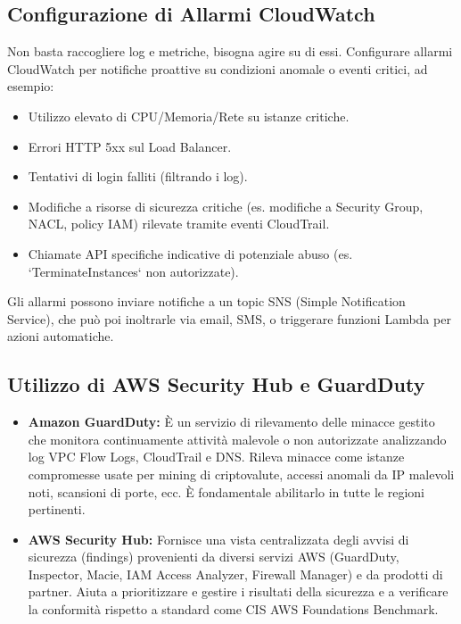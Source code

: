 \documentclass[a4paper,12pt]{report}
\begin{document}
\subsection{Configurazione di Allarmi CloudWatch}
\label{subsec:cloudwatch-alarms}
Non basta raccogliere log e metriche, bisogna agire su di essi. Configurare allarmi CloudWatch per notifiche proattive su condizioni anomale o eventi critici, ad esempio:
\begin{itemize}
    \item Utilizzo elevato di CPU/Memoria/Rete su istanze critiche.
    \item Errori HTTP 5xx sul Load Balancer.
    \item Tentativi di login falliti (filtrando i log).
    \item Modifiche a risorse di sicurezza critiche (es. modifiche a Security Group, NACL, policy IAM) rilevate tramite eventi CloudTrail.
    \item Chiamate API specifiche indicative di potenziale abuso (es. `TerminateInstances` non autorizzate).
\end{itemize}
Gli allarmi possono inviare notifiche a un topic SNS (Simple Notification Service), che può poi inoltrarle via email, SMS, o triggerare funzioni Lambda per azioni automatiche.

\subsection{Utilizzo di AWS Security Hub e GuardDuty}
\label{subsec:security-hub-guardduty}
\begin{itemize}
    \item \textbf{Amazon GuardDuty:} È un servizio di rilevamento delle minacce gestito che monitora continuamente attività malevole o non autorizzate analizzando log VPC Flow Logs, CloudTrail e DNS. Rileva minacce come istanze compromesse usate per mining di criptovalute, accessi anomali da IP malevoli noti, scansioni di porte, ecc. È fondamentale abilitarlo in tutte le regioni pertinenti.
    \item \textbf{AWS Security Hub:} Fornisce una vista centralizzata degli avvisi di sicurezza (findings) provenienti da diversi servizi AWS (GuardDuty, Inspector, Macie, IAM Access Analyzer, Firewall Manager) e da prodotti di partner. Aiuta a prioritizzare e gestire i risultati della sicurezza e a verificare la conformità rispetto a standard come CIS AWS Foundations Benchmark.
\end{itemize}
\end{document}
